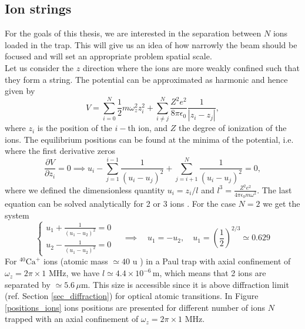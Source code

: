 \subsection{Ion strings}
\label{ionstrings}
For the goals of this thesis, we are interested in the separation between $N$ ions loaded in the trap. This will give us an idea of how narrowly the beam should be focused and will set an appropriate problem spatial scale.\\
Let us consider the $z$ direction where the ions are more weakly confined such that they form a string. The potential can be approximated as harmonic and hence given by
\begin{equation}
V = \sum_{i=0}^N \frac{1}{2}m\omega_z^2z_i^2 + \sum_{i\neq j}^N\frac{Z^2e^2}{8\pi \epsilon_0}\frac{1}{|z_i-z_j|},
\end{equation}
where $z_i$ is the position of the $i-$th ion, and $Z$ the degree of ionization of the ions. The equilibrium positions can be found at the minima of the potential, i.e. where the first derivative zeros
\begin{equation}
\frac{\partial V}{\partial z_i} = 0 \implies u_i - \sum_{j=1}^{i-1} \frac{1}{(u_i-u_j)^2} + \sum_{j= i+1}^{N} \frac{1}{(u_i-u_j)^2}= 0,
\end{equation}
where we defined the dimensionless quantity $u_i = z_i/l$ and $l^3 = \displaystyle\frac{Z^2 e^2 }{4\pi \epsilon_0 m\omega^2}$.
The last equation can be solved analytically for 2 or 3 ions \cite{ion_spacing}. For the case $N=2$ we get the system
\begin{equation}
\begin{cases}
  u_1 + \frac{1}{(u_1-u_2)^2} = 0\\
  u_2 - \frac{1}{(u_1-u_2)^2} = 0
  \end{cases} \quad \implies \quad u_1 = -u_2,\quad  u_1 = \left(\frac{1}{2}\right)^{2/3} \simeq 0.629
\end{equation}
For $^{40}\text{Ca}^+$ ions (atomic mass $\simeq 40$ u \cite{AUDI2003337}) in a Paul trap with axial confinement of $\omega_z = 2\pi \times 1$ MHz, we have $l \simeq 4.4\times 10^{-6}\,$m, which means that 2 ions are separated by $\simeq 5.6\, \mu$m. This size is accessible since it is above diffraction limit (ref. Section \ref{sec_diffraction}) for optical atomic transitions.
In Figure \ref{positions_ions} ions positions are presented for different number of ions $N$ trapped with an axial confinement of $\omega_z = 2\pi \times 1$ MHz.

